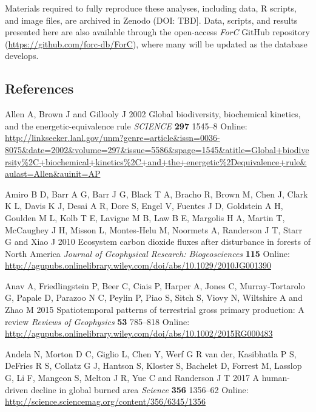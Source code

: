 \documentclass[
]{article}
\newlength{\cslhangindent}
\newenvironment{cslreferences}%
  {\setlength{\parindent}{0pt}%
  \everypar{\setlength{\hangindent}{\cslhangindent}}\ignorespaces}%
  {\par}
\begin{document}
Materials required to fully reproduce these analyses, including data, R
scripts, and image files, are archived in Zenodo (DOI: TBD{]}. Data,
scripts, and results presented here are also available through the
open-access \emph{ForC} GitHub repository
(\url{https://github.com/forc-db/ForC}), where many will be updated as
the database develops.

\hypertarget{references}{%
\subsection*{References}\label{references}}

\hypertarget{refs}{}
\begin{cslreferences}
\leavevmode\hypertarget{ref-allen_global_2002}{}%
Allen A, Brown J and Gillooly J 2002 Global biodiversity, biochemical
kinetics, and the energetic-equivalence rule \emph{SCIENCE} \textbf{297}
1545--8 Online:
\url{http://linkseeker.lanl.gov/unm?genre=article\&issn=0036-8075\&date=2002\&volume=297\&issue=5586\&spage=1545\&atitle=Global+biodiversity\%2C+biochemical+kinetics\%2C+and+the+energetic\%2Dequivalence+rule\&aulast=Allen\&auinit=AP}

\leavevmode\hypertarget{ref-amiro_ecosystem_2010}{}%
Amiro B D, Barr A G, Barr J G, Black T A, Bracho R, Brown M, Chen J,
Clark K L, Davis K J, Desai A R, Dore S, Engel V, Fuentes J D, Goldstein
A H, Goulden M L, Kolb T E, Lavigne M B, Law B E, Margolis H A, Martin
T, McCaughey J H, Misson L, Montes‐Helu M, Noormets A, Randerson J T,
Starr G and Xiao J 2010 Ecosystem carbon dioxide fluxes after
disturbance in forests of North America \emph{Journal of Geophysical
Research: Biogeosciences} \textbf{115} Online:
\url{http://agupubs.onlinelibrary.wiley.com/doi/abs/10.1029/2010JG001390}

\leavevmode\hypertarget{ref-anav_spatiotemporal_2015}{}%
Anav A, Friedlingstein P, Beer C, Ciais P, Harper A, Jones C,
Murray‐Tortarolo G, Papale D, Parazoo N C, Peylin P, Piao S, Sitch S,
Viovy N, Wiltshire A and Zhao M 2015 Spatiotemporal patterns of
terrestrial gross primary production: A review \emph{Reviews of
Geophysics} \textbf{53} 785--818 Online:
\url{http://agupubs.onlinelibrary.wiley.com/doi/abs/10.1002/2015RG000483}

\leavevmode\hypertarget{ref-andela_human-driven_2017}{}%
Andela N, Morton D C, Giglio L, Chen Y, Werf G R van der, Kasibhatla P
S, DeFries R S, Collatz G J, Hantson S, Kloster S, Bachelet D, Forrest
M, Lasslop G, Li F, Mangeon S, Melton J R, Yue C and Randerson J T 2017
A human-driven decline in global burned area \emph{Science} \textbf{356}
1356--62 Online:
\url{http://science.sciencemag.org/content/356/6345/1356}


\end{cslreferences}
\end{document}
